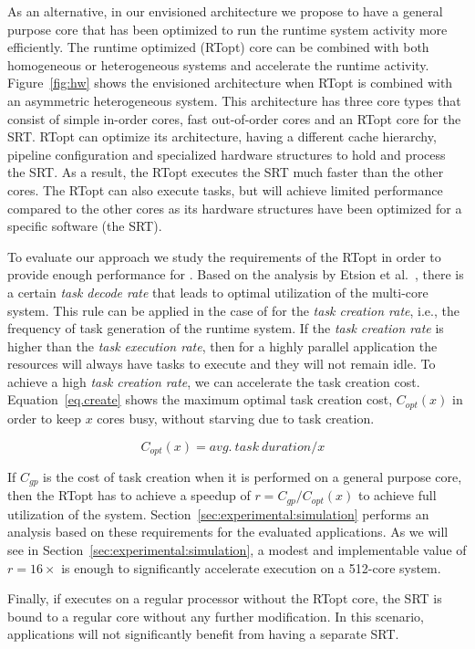 As an alternative, in our envisioned architecture we propose to have a general purpose core that has been optimized to run the runtime system activity more efficiently. 
The runtime optimized (RTopt) core can be combined with both homogeneous or heterogeneous systems and accelerate the runtime activity.
Figure~\ref{fig:hw} shows the envisioned architecture when RTopt is combined with an asymmetric heterogeneous system.
This architecture has three core types that consist of simple in-order cores, fast out-of-order cores and an RTopt core for the SRT. 
RTopt can optimize its architecture, having a different cache hierarchy, pipeline configuration and specialized hardware structures to hold and process the SRT. 
As a result, the RTopt executes the SRT much faster than the other cores. 
The RTopt can also execute tasks, but will achieve limited performance compared to the other cores as its hardware structures have been optimized for a specific software (the SRT).

To evaluate our approach we study the requirements of the RTopt in order to provide enough performance for {\proposal}.
Based on the analysis by Etsion et al.~\cite{TaskSS}, there is a certain \textit{task decode rate} that leads to optimal utilization of the multi-core system.
This rule can be applied in the case of {\proposal} for the \textit{task creation rate}, i.e., the frequency of task generation of the runtime system.
If the \textit{task creation rate} is higher than the \textit{task execution rate}, then for a highly parallel application the resources will always have tasks to execute and they will not remain idle.
To achieve a high \textit{task creation rate}, we can accelerate the task creation cost.
Equation~\ref{eq.create} shows the maximum optimal task creation cost, $C_{opt}(x)$ in order to keep $x$ cores busy, without starving due to task creation.

\begin{equation}
  \text{$C_{opt}(x) = avg.\ task\ duration / x$ }
\label{eq.create}
\end{equation}

If $C_{gp}$ is the cost of task creation when it is performed on a general purpose core, then the RTopt has to achieve a speedup of $r = C_{gp}/C_{opt}(x)$ to achieve full utilization of the system. 
Section~\ref{sec:experimental:simulation} performs an analysis based on these requirements for the evaluated applications. 
As we will see in Section~\ref{sec:experimental:simulation}, a modest and implementable value of $r=16\times$ is enough to significantly accelerate execution on a 512-core system.

Finally, if {\proposal} executes on a regular processor without the RTopt core, the SRT is bound to a regular core without any further modification. In this scenario, applications will not significantly benefit from having a separate SRT.



